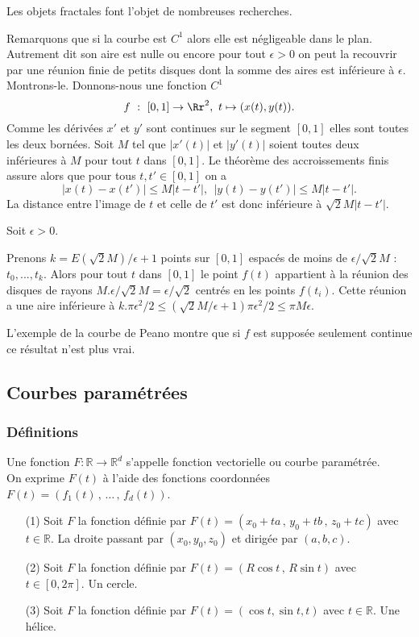 \documentclass[class=report,crop=false]{standalone}
\begin{document}
Les objets fractales font l'objet de nombreuses recherches.

Remarquons que si la courbe est $C^1$ alors elle est négligeable dans le plan. Autrement dit son aire est nulle ou encore pour tout $\epsilon>0$ on peut la recouvrir par une réunion finie de petits disques dont la somme des aires est inférieure \`a $\epsilon$. Montrons-le.
Donnons-nous une fonction $C^1$
$$
f\ :\ [0,1]\rightarrow \Rr^2,\ t\mapsto (x(t),y(t)).
$$
Comme les dérivées $x'$ et $y'$ sont continues sur le segment $[0,1]$ elles sont toutes les deux bornées. Soit $M$ tel que $|x'(t)|$ et $|y'(t)|$ soient toutes deux inférieures \`a $M$ pour tout $t$ dans $[0,1]$. 
Le théor\`eme des accroissements finis assure alors que pour tous $t,t'\in[0,1]$ on a  
$$
|x(t)-x(t')|\leq M|t-t'|,\ \ |y(t)-y(t')|\leq M|t-t'|.
$$
La distance entre l'image de $t$ et celle de $t'$ est donc inférieure \`a $\sqrt{2}M|t-t'|$. 

Soit $\epsilon>0$.

Prenons  $k=E(\sqrt{2}M)/\epsilon+1$ points sur $[0,1]$ espacés de moins de $\epsilon/\sqrt{2}M$ : $t_0,...,t_k$.
Alors pour tout $t$ dans $[0,1]$ le point $f(t)$ appartient \`a la réunion des disques de rayons $M.\epsilon/\sqrt{2}M=\epsilon/\sqrt{2}$ centrés en les points $f(t_i)$. Cette réunion a une aire inférieure \`a $k.\pi\epsilon^2/2\leq (\sqrt{2}M/\epsilon+1)\pi\epsilon^2/2\leq \pi M\epsilon$. 

L'exemple de la courbe de Peano montre que si $f$ est supposée seulement continue ce résultat n'est plus vrai. 

\subsection{Courbes paramétrées}
\subsubsection{Définitions}
\begin{definition}
Une fonction $F : \mathbb{R} \rightarrow \mathbb{R}^d$ s'appelle fonction vectorielle ou courbe paramétrée.\\
On exprime $F(t)$ \`a l'aide des fonctions coordonnées $F(t) = (f_{1}(t) \,,\, \dots \,,\, f_{d}(t))$.
\end{definition}

\begin{enumerate}
\item[(1)] Soit $F$ la fonction définie par $F(t) = (x_{0} + ta\,,\,y_{0} + tb\,,\,z_{0} + tc)$ avec $t\in \mathbb R$. La droite passant par  $(x_0,y_0,z_0)$ et dirigée par $(a,b,c)$.
\item[(2)] Soit $F$ la fonction définie par $F(t) = (R \cos t\,,\,R \sin t)$ avec $t\in [0,2\pi]$. Un cercle.
\item[(3)] Soit $F$ la fonction définie par $F(t) = ( \cos t, \sin t, t)$ avec $t\in \mathbb R$. Une hélice.
\end{enumerate}
\end{document}
